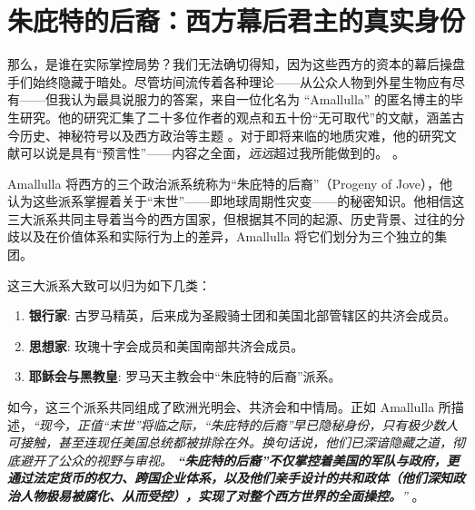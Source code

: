 \documentclass[10pt,twocolumn,letterpaper]{article}
\begin{document}
\section{朱庇特的后裔：西方幕后君主的真实身份}
那么，是谁在实际掌控局势？我们无法确切得知，因为这些西方的资本的幕后操盘手们始终隐藏于暗处。尽管坊间流传着各种理论——从公众人物到外星生物应有尽有——但我认为最具说服力的答案，来自一位化名为 “Amallulla” 的匿名博主的毕生研究。他的研究汇集了二十多位作者的观点和五十份“无可取代”的文献，涵盖古今历史、神秘符号以及西方政治等主题 \cite{33,34}。对于即将来临的地质灾难，他的研究文献可以说是具有“预言性”——内容之全面，\textit{远远}超过我所能做到的。 \cite{33,34}。

Amallulla 将西方的三个政治派系统称为“朱庇特的后裔”（Progeny of Jove），他认为这些派系掌握着关于“末世”——即地球周期性灾变——的秘密知识。他相信这三大派系共同主导着当今的西方国家，但根据其不同的起源、历史背景、过往的分歧以及在价值体系和实际行为上的差异，Amallulla 将它们划分为三个独立的集团。

这三大派系大致可以归为如下几类：

\begin{flushleft}
\begin{enumerate}
    \item \textbf{银行家}: 古罗马精英，后来成为圣殿骑士团和美国北部管辖区的共济会成员。
    \item \textbf{思想家}: 玫瑰十字会成员和美国南部共济会成员。
    \item \textbf{耶稣会与黑教皇}: 罗马天主教会中“朱庇特的后裔”派系。
\end{enumerate}
\end{flushleft}

如今，这三个派系共同组成了欧洲光明会、共济会和中情局。正如 Amallulla 所描述，\textit{“现今，正值“末世”将临之际，“朱庇特的后裔”早已隐秘身份，只有极少数人可接触，甚至连现任美国总统都被排除在外。换句话说，他们已深谙隐藏之道，彻底避开了公众的视野与审视。 \textbf{“朱庇特的后裔”不仅掌控着美国的军队与政府，更通过法定货币的权力、跨国企业体系，以及他们亲手设计的共和政体（他们深知政治人物极易被腐化、从而受控），实现了对整个西方世界的全面操控。}”} \cite{33,34}。
\end{document}
